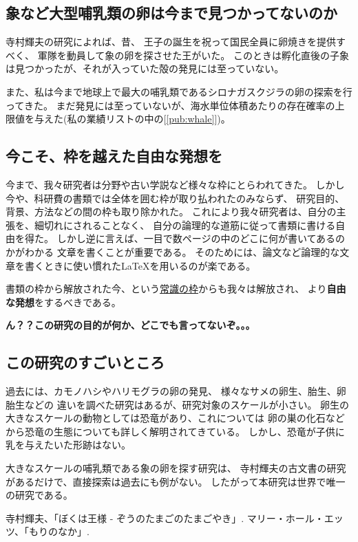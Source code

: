 \documentclass[11pt,a4j,dvipdfmx]{jarticle} 					%
\newcommand{\研究課題名}{象の卵}
\newcommand{\研究機関名}{逢坂大学}
\newcommand{\研究代表者氏名}{湯川秀樹}
\newcommand{\研究期間の最終元号年度}{8}  %
\begin{document}
\subsection{象など大型哺乳類の卵は今まで見つかってないのか}
寺村輝夫の研究\cite{teramura}によれば、昔、
王子の誕生を祝って国民全員に卵焼きを提供すべく、
軍隊を動員して象の卵を探させた王がいた。
このときは孵化直後の子象は見つかったが、それが入っていた殻の発見には至っていない。

また、私は今まで地球上で最大の哺乳類であるシロナガスクジラの卵の探索を行ってきた。
まだ発見には至っていないが、海水単位体積あたりの存在確率の上限値を与えた(私の業績リストの中の[\ref{pub:whale}])。

\subsection{今こそ、枠を越えた自由な発想を}
今まで、我々研究者は分野や古い学説など様々な枠にとらわれてきた。
しかし今や、科研費の書類では全体を囲む枠が取り払われたのみならず、
研究目的、背景、方法などの間の枠も取り除かれた。
これにより我々研究者は、自分の主張を、細切れにされることなく、
自分の論理的な道筋に従って書類に書ける自由を得た。
しかし逆に言えば、一目で数ページの中のどこに何が書いてあるのかがわかる
文章を書くことが重要である。
そのためには、論文など論理的な文章を書くときに使い慣れた\LaTeX を用いるのが楽である。

書類の枠から解放された今、という\underline{常識の枠}からも我々は解放され、
より\textbf{自由な発想}をするべきである。

\textbf{ん？？この研究の目的が何か、どこでも言ってないぞ。。。}

\subsection{この研究のすごいところ}
	過去には、カモノハシやハリモグラの卵の発見、
	様々なサメの卵生、胎生、卵胎生などの
	違いを調べた研究はあるが、研究対象のスケールが小さい。
	卵生の大きなスケールの動物としては恐竜があり、これについては
	卵の巣の化石などから恐竜の生態についても詳しく解明されてきている。
	しかし、恐竜が子供に乳を与えたいた形跡はない。
	
	大きなスケールの哺乳類である象の卵を探す研究は、
	寺村輝夫の古文書の研究があるだけで、直接探索は過去にも例がない。
	したがって本研究は世界で唯一の研究である。




\vspace*{1zw}
\begin{thebibliography}{99}
	 寺村輝夫、「ぼくは王様 - ぞうのたまごのたまごやき」.
	 マリー・ホール・エッツ、「もりのなか」.
\end{thebibliography}
\end{document}
